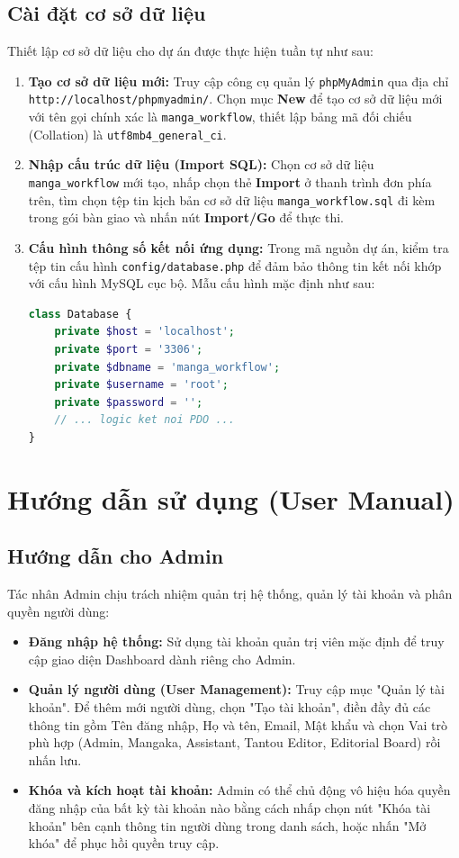 \subsection{Cài đặt cơ sở dữ liệu}
\label{subsec:install_database}
Thiết lập cơ sở dữ liệu cho dự án được thực hiện tuần tự như sau:
\begin{enumerate}
    \item \textbf{Tạo cơ sở dữ liệu mới:} Truy cập công cụ quản lý \texttt{phpMyAdmin} qua địa chỉ \texttt{http://localhost/phpmyadmin/}. Chọn mục \textbf{New} để tạo cơ sở dữ liệu mới với tên gọi chính xác là \texttt{manga\_workflow}, thiết lập bảng mã đối chiếu (Collation) là \texttt{utf8mb4\_general\_ci}.
    \item \textbf{Nhập cấu trúc dữ liệu (Import SQL):} Chọn cơ sở dữ liệu \texttt{manga\_workflow} mới tạo, nhấp chọn thẻ \textbf{Import} ở thanh trình đơn phía trên, tìm chọn tệp tin kịch bản cơ sở dữ liệu \texttt{manga\_workflow.sql} đi kèm trong gói bàn giao và nhấn nút \textbf{Import/Go} để thực thi.
    \item \textbf{Cấu hình thông số kết nối ứng dụng:} Trong mã nguồn dự án, kiểm tra tệp tin cấu hình \texttt{config/database.php} để đảm bảo thông tin kết nối khớp với cấu hình MySQL cục bộ. Mẫu cấu hình mặc định như sau:
\begin{lstlisting}[language=PHP]
class Database {
    private $host = 'localhost';
    private $port = '3306';
    private $dbname = 'manga_workflow';
    private $username = 'root';
    private $password = '';
    // ... logic ket noi PDO ...
}
\end{lstlisting}
\end{enumerate}

\section{Hướng dẫn sử dụng (User Manual)}
\label{sec:user_manual}

\subsection{Hướng dẫn cho Admin}
\label{subsec:manual_admin}
Tác nhân Admin chịu trách nhiệm quản trị hệ thống, quản lý tài khoản và phân quyền người dùng:
\begin{itemize}
    \item \textbf{Đăng nhập hệ thống:} Sử dụng tài khoản quản trị viên mặc định để truy cập giao diện Dashboard dành riêng cho Admin.
    \item \textbf{Quản lý người dùng (User Management):} Truy cập mục "Quản lý tài khoản". Để thêm mới người dùng, chọn "Tạo tài khoản", điền đầy đủ các thông tin gồm Tên đăng nhập, Họ và tên, Email, Mật khẩu và chọn Vai trò phù hợp (Admin, Mangaka, Assistant, Tantou Editor, Editorial Board) rồi nhấn lưu.
    \item \textbf{Khóa và kích hoạt tài khoản:} Admin có thể chủ động vô hiệu hóa quyền đăng nhập của bất kỳ tài khoản nào bằng cách nhấp chọn nút "Khóa tài khoản" bên cạnh thông tin người dùng trong danh sách, hoặc nhấn "Mở khóa" để phục hồi quyền truy cập.
\end{itemize}

